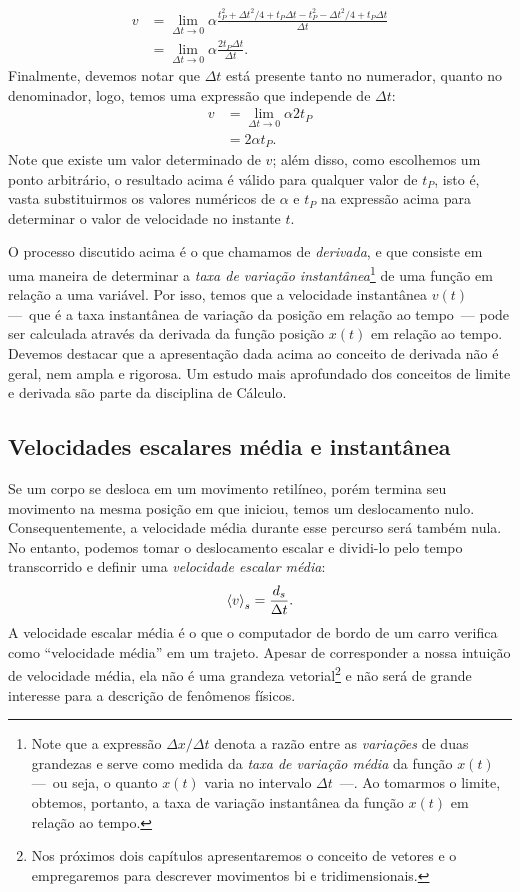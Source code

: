 \begin{align}
    v &= \lim_{\Delta t \to 0} \alpha\frac{t_P^2 + \Delta t^2/4 + t_P\Delta t - t_P^2 - \Delta t^2/4 + t_P\Delta t}{\Delta t} \\
    &= \lim_{\Delta t \to 0} \alpha\frac{2 t_P\Delta t}{\Delta t}.
\end{align}
%
Finalmente, devemos notar que $\Delta t$ está presente tanto no numerador, quanto no denominador, logo, temos uma expressão que independe de $\Delta t$:
\begin{align}
    v &=  \lim_{\Delta t \to 0} \alpha 2 t_P \\
    &= 2 \alpha t_P.
\end{align}
%
Note que existe um valor determinado de $v$; além disso, como escolhemos um ponto arbitrário, o resultado acima é válido para qualquer valor de $t_P$, isto é, vasta substituirmos os valores numéricos de $\alpha$ e $t_P$ na expressão acima para determinar o valor de velocidade no instante $t$.

O processo discutido acima é o que chamamos de \emph{derivada}, e que consiste em uma maneira de determinar a \emph{taxa de variação instantânea}\footnote{Note que a expressão $\Delta x/\Delta t$ denota a razão entre as \emph{variações} de duas grandezas e serve como medida da \emph{taxa de variação média} da função $x(t)$ ---~ou seja, o quanto $x(t)$ varia no intervalo $\Delta t$~---. Ao tomarmos o limite, obtemos, portanto, a taxa de variação instantânea da função $x(t)$ em relação ao tempo.} de uma função em relação a uma variável. Por isso, temos que a velocidade instantânea $v(t)$ ---~que é a taxa instantânea de variação da posição em relação ao tempo~--- pode ser calculada através da derivada da função posição $x(t)$ em relação ao tempo. Devemos destacar que a apresentação dada acima ao conceito de derivada não é geral, nem ampla e rigorosa. Um estudo mais aprofundado dos conceitos de limite e derivada são parte da disciplina de Cálculo.

\subsection{Velocidades escalares média e instantânea}

Se um corpo se desloca em um movimento retilíneo, porém termina seu movimento na mesma posição em que iniciou, temos um deslocamento nulo. Consequentemente, a velocidade média durante esse percurso será também nula. No entanto, podemos tomar o deslocamento escalar e dividi-lo pelo tempo transcorrido e definir uma \emph{velocidade escalar média}:
\begin{equation}
  \left\langle{v}\right\rangle_s = \frac{d_s}{\Delta t}.
\end{equation}
%
A velocidade escalar média é o que o computador de bordo de um carro verifica como ``velocidade média'' em um trajeto. Apesar de corresponder a nossa intuição de velocidade média, ela não é uma grandeza vetorial\footnote{Nos próximos dois capítulos apresentaremos o conceito de vetores e o empregaremos para descrever movimentos bi e tridimensionais.} e não será de grande interesse para a descrição de fenômenos físicos.

